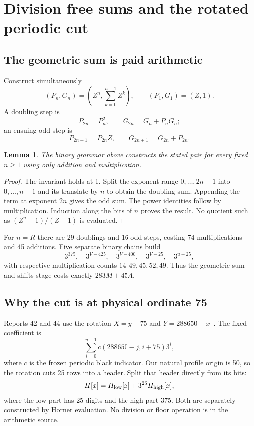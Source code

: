 \documentclass[11pt,letterpaper]{article}
\newtheorem{lemma}[theorem]{Lemma}
\theoremstyle{definition}\newtheorem{definition}[theorem]{Definition}
\theoremstyle{remark}\newtheorem{remark}[theorem]{Remark}
\newcommand{\codem}[1]{\mbox{\normalfont\ttfamily\detokenize{#1}}}
\begin{document}
\section{Division free sums and the rotated periodic cut}\label{ptr:sc:sec:cut}
\subsection{The geometric sum is paid arithmetic}
Construct simultaneously
\[
 (P_n,G_n)=\left(Z^n,\sum_{k=0}^{n-1}Z^k\right),\qquad (P_1,G_1)=(Z,1).
\]
A doubling step is
\[
 P_{2n}=P_n^2,\qquad G_{2n}=G_n+P_nG_n;
\]
an ensuing odd step is
\[
 P_{2n+1}=P_{2n}Z,\qquad G_{2n+1}=G_{2n}+P_{2n}.
\]
\begin{lemma}\label{ptr:sc:lem:geometric}
The binary grammar above constructs the stated pair for every fixed $n\ge1$ using only addition and multiplication.
\end{lemma}
\begin{proof}
The invariant holds at 1. Split the exponent range $0,\ldots,2n-1$ into $0,\ldots,n-1$ and its translate by $n$ to obtain the doubling sum. Appending the term at exponent $2n$ gives the odd sum. The power identities follow by multiplication. Induction along the bits of $n$ proves the result. No quotient such as $(Z^n-1)/(Z-1)$ is evaluated.
\end{proof}
For $n=R$ there are 29 doublings and 16 odd steps, costing 74 multiplications and 45 additions. Five separate binary chains build
\[
 3^{375},\quad3^{V-425},\quad3^{V-400},\quad3^{V-25},\quad3^{u-25},
\]
with respective multiplication counts $14,49,45,52,49$. Thus the geometric-sum-and-shifts stage costs exactly $283M+45A$.

\subsection{Why the cut is at physical ordinate 75}
Reports 42 and 44 use the rotation $X=y-75$ and $Y=288650-x$~\cite{ptr:sc:report42,ptr:sc:report44}. The fixed coefficient \codem{tile:j} is
\begin{equation}\label{ptr:sc:eq:oldtile}
 \sum_{i=0}^{u-1}c(288650-j,i+75)3^i,
\end{equation}
where $c$ is the frozen periodic black indicator. Our natural profile origin is 50, so the rotation cuts 25 rows into a header. Split that header directly from its bits:
\[
 H[x]=H_{\rm low}[x]+3^{25}H_{\rm high}[x],
\]
where the low part has 25 digits and the high part 375. Both are separately constructed by Horner evaluation. No division or floor operation is in the arithmetic source.
\end{document}
